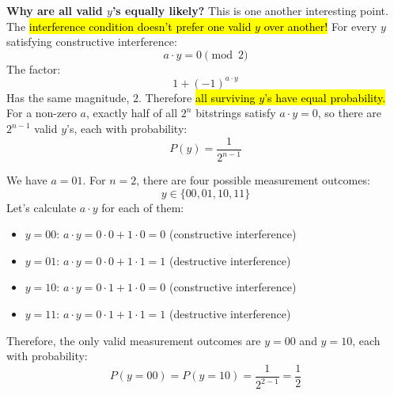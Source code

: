 \highspace
\textcolor{Green3}{ \textbf{Why are all valid $y$'s equally likely?}} This is one another interesting point. The \hl{interference condition doesn't prefer one valid $y$ over another!} For every $y$ satisfying constructive interference:
\begin{equation*}
    a \cdot y = 0 \pmod 2
\end{equation*}
The factor:
\begin{equation*}
    1 + (-1)^{a \cdot y}
\end{equation*}
Has the same magnitude, $2$. Therefore \hl{all surviving $y$'s have equal probability.} For a non-zero $a$, exactly half of all $2^n$ bitstrings satisfy $a \cdot y = 0$, so there are $2^{n-1}$ valid $y$'s, each with probability:
\begin{equation*}
    P(y) = \frac{1}{2^{n-1}}
\end{equation*}

\begin{examplebox}
    We have $a=01$. For $n=2$, there are four possible measurement outcomes:
    \begin{equation*}
        y \in \{00, 01, 10, 11\}
    \end{equation*}
    Let's calculate $a \cdot y$ for each of them:
    \begin{itemize}
        \item $y=00$: $a \cdot y = 0\cdot 0 + 1 \cdot 0 = 0$ (constructive interference)
        \item $y=01$: $a \cdot y = 0\cdot 0 + 1 \cdot 1 = 1$ (destructive interference)
        \item $y=10$: $a \cdot y = 0\cdot 1 + 1 \cdot 0 = 0$ (constructive interference)
        \item $y=11$: $a \cdot y = 0\cdot 1 + 1 \cdot 1 = 1$ (destructive interference)
    \end{itemize}
    Therefore, the only valid measurement outcomes are $y=00$ and $y=10$, each with probability:
    \begin{equation*}
        P(y=00) = P(y=10) = \frac{1}{2^{2-1}} = \frac{1}{2}
    \end{equation*}
\end{examplebox}


